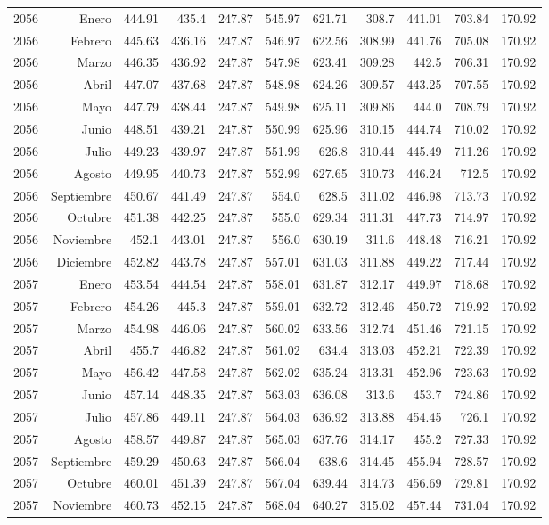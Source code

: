 \documentclass{article}%
\begin{document}
\begin{longtable}{|l r|r|r|r|r|r|r|r|r|r|}
2056&Enero&444.91&435.4&247.87&545.97&621.71&308.7&441.01&703.84&170.92\\%
2056&Febrero&445.63&436.16&247.87&546.97&622.56&308.99&441.76&705.08&170.92\\%
2056&Marzo&446.35&436.92&247.87&547.98&623.41&309.28&442.5&706.31&170.92\\%
2056&Abril&447.07&437.68&247.87&548.98&624.26&309.57&443.25&707.55&170.92\\%
2056&Mayo&447.79&438.44&247.87&549.98&625.11&309.86&444.0&708.79&170.92\\%
2056&Junio&448.51&439.21&247.87&550.99&625.96&310.15&444.74&710.02&170.92\\%
2056&Julio&449.23&439.97&247.87&551.99&626.8&310.44&445.49&711.26&170.92\\%
2056&Agosto&449.95&440.73&247.87&552.99&627.65&310.73&446.24&712.5&170.92\\%
2056&Septiembre&450.67&441.49&247.87&554.0&628.5&311.02&446.98&713.73&170.92\\%
2056&Octubre&451.38&442.25&247.87&555.0&629.34&311.31&447.73&714.97&170.92\\%
2056&Noviembre&452.1&443.01&247.87&556.0&630.19&311.6&448.48&716.21&170.92\\%
2056&Diciembre&452.82&443.78&247.87&557.01&631.03&311.88&449.22&717.44&170.92\\%
2057&Enero&453.54&444.54&247.87&558.01&631.87&312.17&449.97&718.68&170.92\\%
2057&Febrero&454.26&445.3&247.87&559.01&632.72&312.46&450.72&719.92&170.92\\%
2057&Marzo&454.98&446.06&247.87&560.02&633.56&312.74&451.46&721.15&170.92\\%
2057&Abril&455.7&446.82&247.87&561.02&634.4&313.03&452.21&722.39&170.92\\%
2057&Mayo&456.42&447.58&247.87&562.02&635.24&313.31&452.96&723.63&170.92\\%
2057&Junio&457.14&448.35&247.87&563.03&636.08&313.6&453.7&724.86&170.92\\%
2057&Julio&457.86&449.11&247.87&564.03&636.92&313.88&454.45&726.1&170.92\\%
2057&Agosto&458.57&449.87&247.87&565.03&637.76&314.17&455.2&727.33&170.92\\%
2057&Septiembre&459.29&450.63&247.87&566.04&638.6&314.45&455.94&728.57&170.92\\%
2057&Octubre&460.01&451.39&247.87&567.04&639.44&314.73&456.69&729.81&170.92\\%
2057&Noviembre&460.73&452.15&247.87&568.04&640.27&315.02&457.44&731.04&170.92\\%

\end{longtable}
\end{document}
